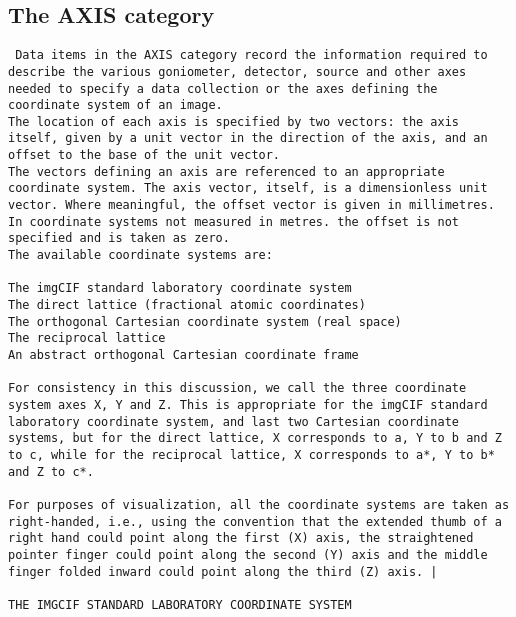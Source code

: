 \documentclass[11pt]{article}
\begin{document}
\subsection{The AXIS category}

{\footnotesize \tt
Data items in the AXIS category record the information required
to describe the various goniometer, detector, source and other
axes needed to specify a data collection or the axes defining the
coordinate system of an image.
~~\\
The location of each axis is specified by two vectors: the axis
itself, given by a  unit vector in the direction of the axis, and
an offset to the base of the unit vector.
~~\\
The vectors defining an axis are referenced to an appropriate
coordinate system.  The axis vector, itself, is a dimensionless
unit vector.  Where meaningful, the offset vector is given in
millimetres.  In coordinate systems not measured in metres.
the offset is not specified and is taken as zero.
~~\\
The available coordinate systems are:\\
~~\\
    The imgCIF standard laboratory coordinate system\\
    The direct lattice (fractional atomic coordinates)\\
    The orthogonal Cartesian coordinate system (real space)\\
    The reciprocal lattice\\
    An abstract orthogonal Cartesian coordinate frame\\
~~\\
For consistency in this discussion, we call the three coordinate
system axes X, Y and Z.  This is appropriate for the imgCIF
standard laboratory coordinate system, and last two Cartesian
coordinate systems, but for the direct lattice, X corresponds
to a, Y to b and Z to c, while for the reciprocal lattice,
X corresponds to a*, Y to b* and Z to c*.\\
~~\\
For purposes of visualization, all the coordinate systems are
taken as right-handed, i.e., using the convention that the extended
thumb of a right hand could point along the first (X) axis, the
straightened pointer finger could point along the second (Y) axis
and the middle finger folded inward could point along the third (Z)
axis.  |\\
~~\\
THE IMGCIF STANDARD LABORATORY COORDINATE SYSTEM\\
}
\end{document}
